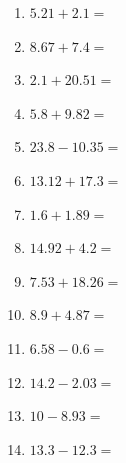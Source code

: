 \documentclass[12pt]{article}
\begin{document}
\begin{enumerate}
\item \large $ 5.21 + 2.1 = $ \vspace{1.5cm}
\item \large $ 8.67 + 7.4 = $ \vspace{1.5cm}
\item \large $ 2.1 + 20.51 = $ \vspace{1.5cm}
\item \large $ 5.8 + 9.82 = $ \vspace{1.5cm}
\newpage
\item \large $ 23.8 - 10.35 = $ \vspace{1.5cm}
\item \large $ 13.12 + 17.3 = $ \vspace{1.5cm}
\item \large $ 1.6 + 1.89 = $ \vspace{1.5cm}
\item \large $ 14.92 + 4.2 = $ \vspace{1.5cm}
\item \large $ 7.53 + 18.26 = $ \vspace{1.5cm}
\item \large $ 8.9 + 4.87 = $ \vspace{1.5cm}
\item \large $ 6.58 - 0.6 = $ \vspace{1.5cm}
\item \large $ 14.2 - 2.03 = $ \vspace{1.5cm}
\item \large $ 10 - 8.93 = $ \vspace{1.5cm}
\item \large $ 13.3 - 12.3 = $ \vspace{1.5cm}
\end{enumerate}\newpage
\end{document}

